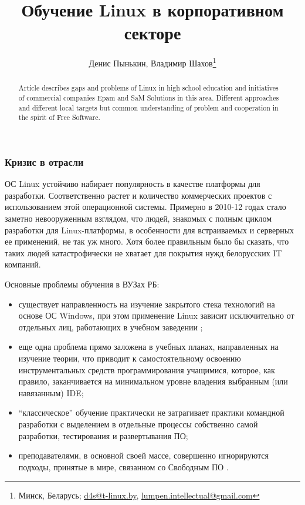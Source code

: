 \documentclass[10pt, a5paper]{article}
\begin{document}
\title{Обучение Linux в корпоративном секторе}
\author{Денис Пынькин, Владимир Шахов\footnote{Минск, Беларусь; \url{d4s@t-linux.by}, \url{lumpen.intellectual@gmail.com}}}
\maketitle
\begin{abstract}
Article describes gaps and problems of Linux in high school education and initiatives of commercial companies Epam and SaM Solutions in this area. Different approaches and different local targets but common understanding of problem and \linebreak cooperation in the spirit of Free Software.
\end{abstract}
\subsubsection*{Кризис в отрасли}

ОС Linux устойчиво набирает популярность в качестве платформы для разработки. Соответственно растет и количество коммерческих проектов с использованием этой операционной системы. Примерно в 2010-12 годах стало заметно невооруженным взглядом, что людей, знакомых с полным циклом разработки
для Linux-платформы, в особенности для встраиваемых и серверных ее применений, не так уж много. Хотя более правильным было бы сказать, что таких людей катастрофически не хватает для покрытия нужд белорусских IT компаний.

Основные проблемы обучения в ВУЗах РБ:

\begin{itemize}
  \item существует направленность на изучение закрытого стека технологий на основе ОС Windows, при этом применение Linux зависит исключительно от отдельных лиц, работающих в учебном заведении \cite{bib1};
  \item еще одна проблема прямо заложена в учебных планах, направленных на изучение теории, что приводит к самостоятельному освоению инструментальных средств программирования учащимися, которое, как правило, заканчивается на минимальном уровне владения выбранным (или навязанным) IDE;
  \item “классическое” обучение практически не затрагивает практики командной разработки с выделением в отдельные процессы собственно самой разработки, тестирования и развертывания ПО;
  \item преподавателями, в основной своей массе, совершенно игнорируются подходы, принятые в мире, связанном со Свободным ПО \cite{bib2}.
\end{itemize}
\end{document}
